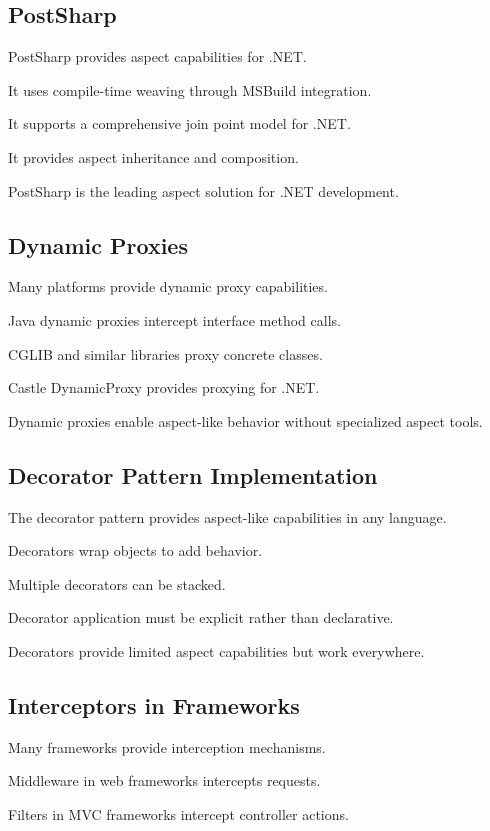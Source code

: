 \documentclass[11pt]{article}
\begin{document}
\subsection{PostSharp}

PostSharp provides aspect capabilities for .NET.

It uses compile-time weaving through MSBuild integration.

It supports a comprehensive join point model for .NET.

It provides aspect inheritance and composition.

PostSharp is the leading aspect solution for .NET development.

\subsection{Dynamic Proxies}

Many platforms provide dynamic proxy capabilities.

Java dynamic proxies intercept interface method calls.

CGLIB and similar libraries proxy concrete classes.

Castle DynamicProxy provides proxying for .NET.

Dynamic proxies enable aspect-like behavior without specialized aspect tools.

\subsection{Decorator Pattern Implementation}

The decorator pattern provides aspect-like capabilities in any language.

Decorators wrap objects to add behavior.

Multiple decorators can be stacked.

Decorator application must be explicit rather than declarative.

Decorators provide limited aspect capabilities but work everywhere.

\subsection{Interceptors in Frameworks}

Many frameworks provide interception mechanisms.

Middleware in web frameworks intercepts requests.

Filters in MVC frameworks intercept controller actions.
\end{document}

